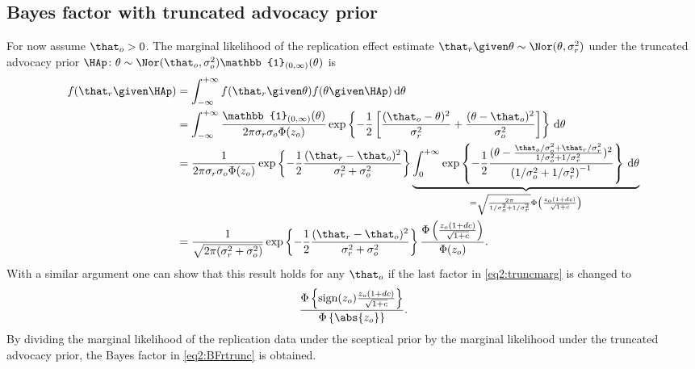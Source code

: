 \begin{subappendices}
\section{Bayes factor with truncated advocacy prior}
\label{app:BFtrunc}
For now assume $\that_o > 0$. The marginal likelihood of the replication effect
estimate $\that_r \given \theta \sim \Nor(\theta, \sigma^2_r)$ under the
truncated advocacy prior
$\HAp \colon \theta \sim \Nor(\that_o, \sigma^2_o) \mathbb{1}_{(0, \infty)}(\theta)$
is
\begin{align}
  f(\that_r \given \HAp)
  &= \int_{-\infty}^{+\infty} f(\that_r \given \theta) f(\theta \given
  \HAp) \, \text{d}\theta \nonumber \\
  &= \int_{-\infty}^{+\infty}
  \frac{\mathbb{1}_{(0, \infty)}(\theta)}{2\pi\sigma_r\sigma_o\Phi(z_o)}
  \exp\left\{-\frac{1}{2}\left[\frac{(\that_o - \theta)^2}{\sigma^2_r}
  + \frac{(\theta - \that_o)^2}{\sigma^2_o}\right]\right\}
  \, \text{d}\theta \nonumber \\
  &=
  \frac{1}{2\pi\sigma_r\sigma_o\Phi(z_o)}
  \exp\left\{-\frac{1}{2}\frac{(\that_r - \that_o)^2}{\sigma^2_r + \sigma^2_o}\right\}
   \underbrace{\int_{0}^{+\infty}
   \exp\left\{-\frac{1}{2}\frac{(\theta - \frac{\that_o/\sigma^2_o +
       \that_r/\sigma^2_r}{1/\sigma^2_o + 1/\sigma^2_r})^2}{\left(
     1/\sigma^2_o + 1/\sigma^2_r\right)^{-1}}\right\}
   \, \text{d}\theta}_{=\sqrt{\frac{2\pi}{1/\sigma^2_o + 1/\sigma^2_r}}
  \Phi\left(\frac{z_o(1 + dc)}{\sqrt{1 + c}}\right)} \nonumber \\
   &= \frac{1}{\sqrt{2\pi(\sigma_r^2 + \sigma_o^2)}}
   \exp\left\{-\frac{1}{2}\frac{(\that_r - \that_o)^2}{\sigma^2_r + \sigma^2_o}
     \right\}  \frac{\Phi\left(\frac{z_o(1 + dc)}{\sqrt{1 + c}}\right)}{
     \Phi(z_o)}.
   \label{eq2:truncmarg}
\end{align}
With a similar argument one can show that this result holds for any $\that_o$ if
the last factor in \eqref{eq2:truncmarg} is changed to
\begin{align*}
  \frac{\Phi\left\{\text{sign}(z_o) \frac{z_o(1 + dc)}{\sqrt{1 + c}}
  \right\}}{\Phi\left\{\abs{z_o}\right\}}.
\end{align*}
By dividing the marginal likelihood of the replication data under the
sceptical prior by the marginal likelihood under the truncated advocacy prior,
the Bayes factor in \eqref{eq2:BFrtrunc} is obtained.



\end{subappendices}
